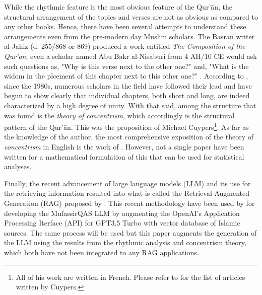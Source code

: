 While the rhythmic feature is the most obvious feature of the Qur'\=an, the structural arrangement of the topics and verses are not as obvious as compared to any other books. Hence, there have been several attempts to understand these arrangements even from the pre-modern day Muslim scholars. The Basran writer al-Jahiz (d. 255/868 or 869) produced a work entitled \textit{The Composition of the Qur'an}, even a scholar named Abu Bakr al-Nisaburi from 4 AH/10 CE would ask such questions as, "Why is this verse next to the other one?" and, "What is the widom in the plcement of this chapter next to this other one?" . According to , since the 1980s, numerous scholars in the field have followed their lead and have begun to show clearly that individual chapters, both short and long, are indeed characterized by a high degree of unity. With that said, among the structure that was found is the \textit{theory of concentrism}, which accordingly is the structural pattern of the Qur'\=an. This was the proposition of Michael Cuypers\footnote{All of his work are written in French. Please refer to  for the list of articles written by Cuypers.}. As far as the knowledge of the author, the most comprehensive exposition of the theory of \textit{concentrism} in English is the work of . However, not a single paper have been written for a mathematical formulation of this that can be used for statistical analyses. 

Finally, the recent advancement of large language models (LLM) and its use for the retrieving information resulted into what is called the Retrieval-Augmented Generation (RAG) proposed by . This recent methodology have been used by  for developing the MufassirQAS LLM by augmenting the OpenAI's Application Processing Iterface (API) for GPT3.5 Turbo with vector database of Islamic sources. The same process will be used but this paper augments the generation of the LLM using the results from the rhythmic analysis and concentrism theory, which both have not been integrated to any RAG applications.